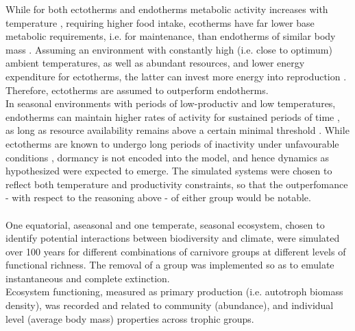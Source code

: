 While for both ectotherms and endotherms metabolic activity increases with temperature \citep{Dillon2010}, requiring higher food intake, ecotherms have far lower base metabolic requirements, i.e. for maintenance, than endotherms of similar body mass \citep{Nagy1999}. Assuming an environment with constantly high (i.e. close to optimum) ambient temperatures, as well as abundant resources,  and lower energy expenditure for ectotherms, the latter can invest more energy into reproduction \cite{Shine2005}. Therefore, ectotherms are assumed to outperform endotherms.\\
In seasonal environments with periods of low-productiv and low temperatures, endotherms can maintain higher rates of activity for sustained periods of time \citep{Buckley2012}, as long as resource availability remains above a certain minimal threshold \cite{Wieser1985}. While ectotherms are known to undergo long periods of inactivity under unfavourable conditions \citep{Shine2005}, dormancy is not encoded into the model, and hence dynamics as hypothesized were expected to emerge. The simulated systems were chosen to reflect both temperature and productivity constraints, so that the outperfomance - with respect to the reasoning above - of either group would be notable.
\\\\
One equatorial, aseasonal and one temperate, seasonal ecosystem, chosen to identify potential interactions between biodiversity and climate, were simulated over 100 years for different combinations of carnivore groups at different levels of functional richness. The removal of a group was implemented so as to emulate instantaneous and complete extinction.\\
Ecosystem functioning, measured as primary production (i.e. autotroph biomass density), was recorded and related to community (abundance), and individual level (average body mass) properties across trophic groups.
%
%
%
